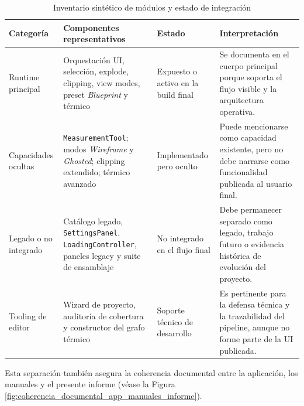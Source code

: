 \begin{table}[p]
    \caption{Inventario sintético de módulos y estado de integración}
    \label{tab:inventario_modulos_integracion}
    \centering
    \footnotesize
    \setlength{\tabcolsep}{3pt}
    \renewcommand{\arraystretch}{0.8}
    \begin{tabular}{>{\RaggedRight\arraybackslash}p{3.05cm}>{\RaggedRight\arraybackslash}p{4.35cm}>{\RaggedRight\arraybackslash}p{2.75cm}>{\RaggedRight\arraybackslash}p{4.2cm}}
        \hline
        \textbf{Categoría} & \textbf{Componentes representativos} & \textbf{Estado} & \textbf{Interpretación} \\ \hline
        Runtime principal & Orquestación UI, selección, explode, clipping, view modes, preset \textit{Blueprint} y térmico & Expuesto o activo en la build final & Se documenta en el cuerpo principal porque soporta el flujo visible y la arquitectura operativa. \\
        Capacidades ocultas & \texttt{MeasurementTool}; modos \textit{Wireframe} y \textit{Ghosted}; clipping extendido; térmico avanzado & Implementado pero oculto & Puede mencionarse como capacidad existente, pero no debe narrarse como funcionalidad publicada al usuario final. \\
        Legado o no integrado & Catálogo legado, \texttt{SettingsPanel}, \texttt{LoadingController}, paneles legacy y suite de ensamblaje & No integrado en el flujo final & Debe permanecer separado como legado, trabajo futuro o evidencia histórica de evolución del proyecto. \\
        Tooling de editor & Wizard de proyecto, auditoría de cobertura y constructor del grafo térmico & Soporte técnico de desarrollo & Es pertinente para la defensa técnica y la trazabilidad del pipeline, aunque no forme parte de la UI publicada. \\ \hline
    \end{tabular}
    \par\vspace{0.5\baselineskip}
\end{table}

Esta separación también asegura la coherencia documental entre la aplicación, los manuales y el presente informe (véase la Figura \ref{fig:coherencia_documental_app_manuales_informe}).

